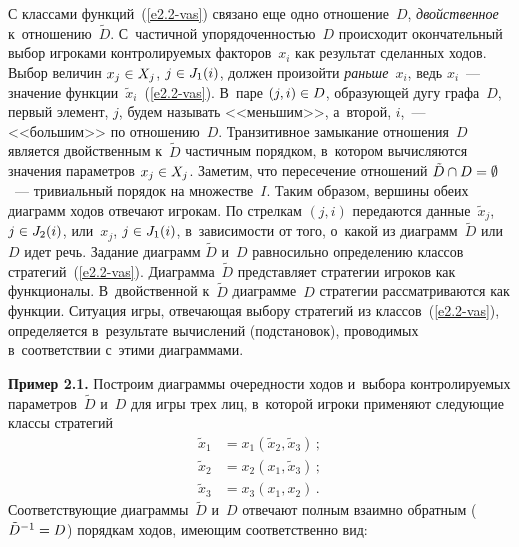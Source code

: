 \begin{multicols}{2}
    С классами функций~(\ref{e2.2-vas}) связано еще одно отношение~$D$,
\textit{двойственное} к~отношению~$\tilde{D}$. С~частичной
упорядоченностью~$D$ происходит окончательный выбор игроками
контролируемых факторов~$x_i$ как результат сделанных ходов. Выбор величин
$x_j\hm\in X_j$, $j\hm\in J_1(i)$, должен произойти \textit{раньше}~$x_i$, ведь
$x_i$~--- значение функции~$\tilde{x}_i$~(\ref{e2.2-vas}). В~паре $(j,i)\hm\in D$,
образующей дугу графа~$D$, первый элемент, $j$, будем называть <<меньшим>>,
а~второй, $i$,~--- <<большим>> по отношению~$D$. Транзитивное замыкание
отношения~$D$ является двойственным к~$\tilde{D}$ частичным порядком,
в~котором вычисляются значения параметров $x_j\hm\in X_j$. Заметим, что
пересечение отношений $\tilde{D}\cap D\hm= \emptyset$~--- тривиальный порядок
на множестве~$I$. Таким образом, вершины обеих диаграмм ходов отвечают
игрокам. По стрелкам $(j,i)$ передаются данные~$\tilde{x}_j$, $j\hm\in J_2(i)$,
или~$x_j$, $j\hm\in J_1(i)$, в~зависимости от того, о~какой из диаграмм~$\tilde{D}$
или~$D$ идет речь. Задание диаграмм $\tilde{D}$ и~$D$ равносильно определению
классов стратегий~(\ref{e2.2-vas}). Диаграмма~$\tilde{D}$ представляет стратегии
игроков как функционалы. В~двойственной к~$\tilde{D}$ диаграмме~$D$ стратегии
рассматриваются как функции. Ситуация игры, отвечающая выбору стратегий из
классов~(\ref{e2.2-vas}), определяется в~результате вычислений (подстановок),
проводимых в~соответствии с~этими диаграммами.

    \smallskip

    \noindent
    \textbf{Пример 2.1.} Построим диаграммы очередности ходов и~выбора
контролируемых параметров~$\tilde{D}$ и~$D$ для игры трех лиц, в~которой
игроки применяют следующие классы стратегий
      \begin{align*}
    \tilde{x}_1 &= x_1\left( \tilde{x}_2, \tilde{x}_3\right)\,;\\
    \tilde{x}_2 &= x_2\left( {x}_1, \tilde{x}_3\right)\,;\\
    \tilde{x}_3 &= x_3\left( {x}_1, {x}_2\right)\,.
    \end{align*}
Соответствующие диаграммы~$\tilde{D}$ и~$D$ отвечают полным взаимно
обратным ($\tilde{D}^{-1}\hm= D$) порядкам ходов, имеющим соответственно вид:
\begin{center}  %
\vspace*{8pt}
\mbox{%
 \epsfxsize=71.415mm
 }
\end{center}

\vspace*{6pt}





\end{multicols}
